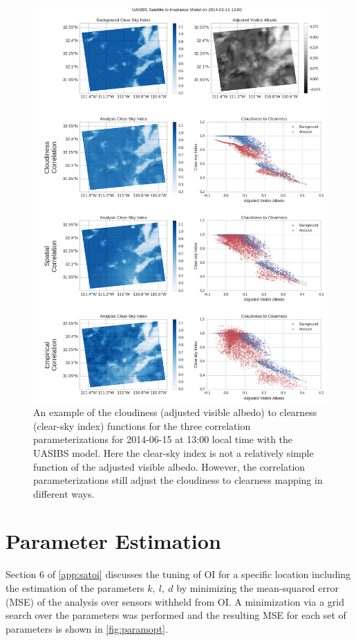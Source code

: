 \begin{figure}[p]
\centering
\includegraphics[width=.9\textwidth]{figs/cld_to_clear_UASIBS_2014-06-15.png}
\caption[Clearness versus Cloudiness for UASIBS on 6/15]{An example
  of the cloudiness (adjusted visible albedo) to clearness (clear-sky
  index) functions for the three correlation parameterizations for
  2014-06-15 at 13:00 local time with the UASIBS model. Here the
  clear-sky index is not a relatively simple function of the adjusted
  visible albedo. However, the correlation parameterizations still
  adjust the cloudiness to clearness mapping in different ways.}
\label{fig:cldclr_ua_615}
\end{figure}


\section{Parameter Estimation}
\label{sec:paramopt}

Section 6 of \cref{app:satoi} discusses the tuning of OI for a
specific location including the estimation of the parameters $k,\:
l,\: d$ by minimizing the mean-squared error (MSE) of the analysis
over sensors withheld from OI.
A minimization via a grid search over the parameters was performed and
the resulting MSE for each set of parameters is shown in
\cref{fig:paramopt}.

